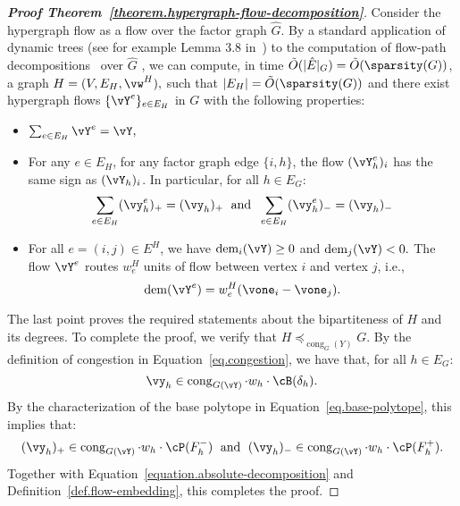 \documentclass[letterpaper]{article}
\newcommand{\dem}{\operatorname{dem}}
\renewcommand{\cong}{\operatorname{cong}}
\begin{document}
\flowdecomposition*
\begin{proof}[{\bf Proof Theorem~\ref{theorem.hypergraph-flow-decomposition}}]
Consider the hypergraph flow as a flow over the factor graph $\hat{G}.$ By a standard application of dynamic trees (see for example Lemma 3.8 in~\cite{shermanBreakingMulticommodityFlow2009}) to the computation of flow-path decompositions~\cite{ahujaravindrakandmagnantithomaslandorlinjamesbNetworkFlowsTheory1993} over $\hat{G}$ , we can compute, in time $\tilde{O}(|\hat{E}|_G)=\tilde{O}(\sparsity(G))$, a graph $H=(V,E_H, \vw^H),$  such that $|E_H|=\tilde{O}(\sparsity(G))$ and there exist hypergraph flows $\{\vY^e\}_{e \in E_H}$ in $G$ with the following properties:
\begin{itemize}
    \item $\sum_{e \in E_H} \vY^e = \vY,$
    \item For any $e \in E_H$, for any factor graph edge $\{i,h\}$, the flow $(\vY^e_h)_i$ has the same sign as $(\vY_h)_i$. In particular, for all $h \in E_G$:
    \begin{equation}\label{equation.absolute-decomposition}
    \sum_{e \in E_H} (\vy^e_h)_+  = (\vy_h)_+ \; \textrm{ and }\; \sum_{e \in E_H} (\vy^e_h)_-  = (\vy_h)_-
    \end{equation}
    \item For all $e=(i,j) \in E^H$, we have $\dem_i(\vY) \geq 0$ and $\dem_j(\vY) < 0.$  The flow $\vY^e$ routes $w^H_{e}$ units of flow between vertex $i$ and vertex $j$, i.e.,
    $$
    \dem(\vY^e)= w^H_{e}(\vone_i - \vone_j).
    $$
\end{itemize}
\noindent
The last point proves the required statements about the bipartiteness of $H$ and its degrees. To complete the proof, we verify that $H \preceq_{\cong_G(Y)} G$.
By the definition of congestion in Equation~\ref{eq.congestion}, we have that, for all $h \in E_G:$
$$
\vy_h \in \cong_{G(\vY)}
\cdot w_h \cdot \cB(\delta_h).
$$
By the characterization of the base polytope in Equation~\ref{eq.base-polytope}, this implies that:
$$
(\vy_h)_+ \in \cong_{G(\vY)}
\cdot w_h \cdot \cP(F^-_h) \; \textrm{ and } \; (\vy_h)_- \in \cong_{G(\vY)}
\cdot w_h \cdot \cP(F^+_h).
$$
Together with Equation~\ref{equation.absolute-decomposition} and Definition~\ref{def.flow-embedding}, this completes the proof.
\end{proof}
 
\end{document}
